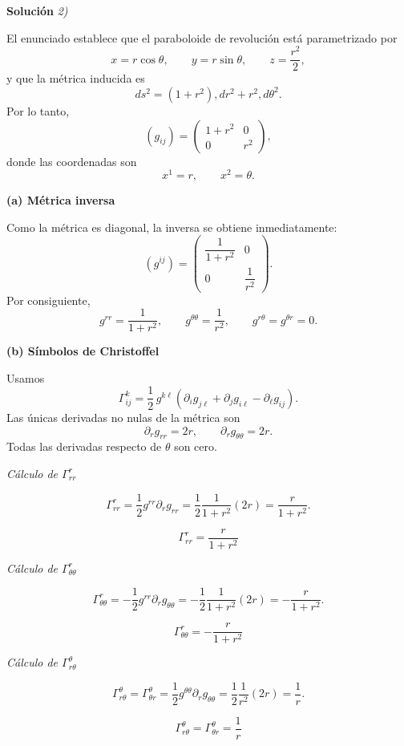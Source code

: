 \documentclass[12pt]{article}
\begin{document}
\vspace{0.5cm}
{\bf Soluci\'on }{\em 2)}
\vspace{0.5cm}

El enunciado establece que el paraboloide de revolución está parametrizado por 
$$
x=r\cos\theta,\qquad
y=r\sin\theta,\qquad
z=\frac{r^2}{2},
$$
y que la métrica inducida es
$$
ds^2=(1+r^2),dr^2+r^2,d\theta^2.
$$
Por lo tanto,
$$
(g_{ij})=
\begin{pmatrix}
1+r^2 & 0\\
0 & r^2
\end{pmatrix},
$$
donde las coordenadas son
$$
x^1=r,\qquad x^2=\theta.
$$

{\bf (a) Métrica inversa}

Como la métrica es diagonal, la inversa se obtiene inmediatamente:
$$
(g^{ij})
=
\begin{pmatrix}
\dfrac1{1+r^2} & 0\\
0 & \dfrac1{r^2}
\end{pmatrix}.
$$
Por consiguiente,
$$
\boxed{
g^{rr}=\frac1{1+r^2},
\qquad
g^{\theta\theta}=\frac1{r^2},
\qquad
g^{r\theta}=g^{\theta r}=0.
}
$$

{\bf (b) Símbolos de Christoffel}

Usamos
$$
\Gamma^k_{ij}
=
\frac12\,g^{k\ell}
\left(
\partial_i g_{j\ell}
+
\partial_j g_{i\ell}
-
\partial_\ell g_{ij}
\right).
$$
Las únicas derivadas no nulas de la métrica son
$$
\partial_r g_{rr}=2r,
\qquad
\partial_r g_{\theta\theta}=2r.
$$
Todas las derivadas respecto de $\theta$ son cero.

{\em Cálculo de $\Gamma^r_{rr}$}

$$
\Gamma^r_{rr}
=
\frac12 g^{rr}\partial_r g_{rr}
=
\frac12\frac1{1+r^2}(2r)
=
\frac{r}{1+r^2}.
$$

$$
\boxed{\Gamma^r_{rr}=\frac{r}{1+r^2}}
$$

{\em Cálculo de $\Gamma^r_{\theta\theta}$}

$$
\Gamma^r_{\theta\theta}
=
-\frac12 g^{rr}\partial_r g_{\theta\theta}
=
-\frac12\frac1{1+r^2}(2r)
=
-\frac{r}{1+r^2}.
$$

$$
\boxed{\Gamma^r_{\theta\theta}
=
-\frac{r}{1+r^2}}
$$

{\em Cálculo de $\Gamma^\theta_{r\theta}$}

$$
\Gamma^\theta_{r\theta}
=
\Gamma^\theta_{\theta r}
=
\frac12 g^{\theta\theta}
\partial_r g_{\theta\theta}
=
\frac12\frac1{r^2}(2r)
=
\frac1r.
$$

$$
\boxed{
\Gamma^\theta_{r\theta}
=
\Gamma^\theta_{\theta r}
=
\frac1r
}
$$
\end{document}
